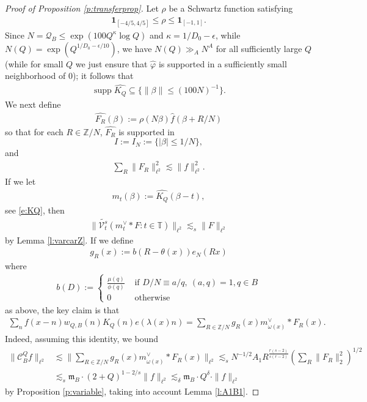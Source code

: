 \documentclass[12pt]{amsart}
\numberwithin{equation}{section}
\theoremstyle{definition}
\begin{document}
\begin{proof}[Proof of Proposition \ref{p:transferprop}]
Let $\rho$ be a Schwartz function satisfying
\begin{align}
    \mathbf{1}_{[-4/5,4/5]} \leq \rho \leq \mathbf{1}_{[-1,1]}.
\end{align}
Since $N=\mathcal Q_B\leq \exp(100 Q^\kappa\log Q)$ and $\kappa=1/D_0-\epsilon$, while $N(Q)=\exp(Q^{1/D_0-\epsilon/10})$, we have $N(Q)\gg_A N^A$ for all sufficiently large $Q$ (while for small $Q$ we just ensure that $\widehat{\varphi}$ is supported in a sufficiently small neighborhood of $0$); it follows that
\begin{align}
    \operatorname{supp}\widehat{K_Q}\subseteq \{\|\beta\|\leq (100N)^{-1}\}.
\end{align}
We next define
\begin{align}
    \widehat{F_R}(\beta) := \rho(N \beta) \widehat{f}(\beta + R/N)
\end{align}
    so that for each $R \in \mathbb{Z}/N$, $\widehat{F_R}$ is supported in 
    \[ I := I_N := \{ |\beta| \leq 1/N\},\]
and
\begin{align}
    \sum_R \| F_R \|_{\ell^2}^2 \lesssim \| f \|_{\ell^2}^2.
\end{align}
If we let 
\begin{align}
    m_t(\beta) := \widehat{K_Q}(\beta - t),
\end{align}
see \eqref{e:KQ},
    then
    \begin{align}
        \| \widetilde{\mathcal{V}_t^s}( m_t^{\vee}*F : t \in \mathbb{T}) \|_{\ell^2} \lesssim_s \|F \|_{\ell^2}
    \end{align}
by Lemma \ref{l:varcarZ}. If we define
\begin{align}
    g_R(x) := b(R- \theta(x)) e_N(Rx)
\end{align}
where
\begin{align}
b(D) := \begin{cases} \frac{\mu(q)}{\phi(q)} & \text{ if } D/N \equiv a/q, \ (a,q) = 1, q \in B \\
    0 & \text{ otherwise} \end{cases}
\end{align}
as above, the key claim is that
\begin{align}\label{e:keyidentity}
    \sum_n f(x-n) w_{Q,B}(n) K_Q(n) e(\lambda(x) n) = \sum_{R \in \mathbb{Z}/N} g_R(x) m_{\omega(x)}^{\vee}*F_R(x).
\end{align}
Indeed, assuming this identity, we bound
\begin{align}
    \| \mathcal{C}_B^Q f \|_{\ell^2} &\lesssim \| \sum_{R \in \mathbb{Z}/N} g_R(x) m_{\omega(x)}^{\vee}*F_R(x) \|_{\ell^2}  \lesssim_s N^{-1/2} A_1 R^{\frac{r(s-2)}{s(r-2)}}   (\sum_R \| F_R \|_2^2)^{1/2}  \\& \lesssim_s \mathfrak m_B \cdot (2 + Q)^{1-2/s} \|f \|_{\ell^2} \lesssim_{\delta} \mathfrak m_B \cdot Q^{\delta} \cdot \|f \|_{\ell^2} 
\end{align}
by Proposition \ref{p:variable}, taking into account Lemma \ref{l:A1B1}.


\end{proof}
\end{document}
